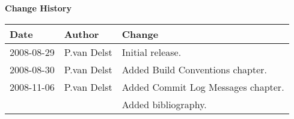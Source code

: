 \thispagestyle{empty}
\vspace*{10cm}
\begin{center}
  {\sffamily\Large\bfseries Change History}
  \begin{table}[htp]
    \centering
    \begin{tabular}{|p{2cm}|p{3cm}|p{8cm}|}
      \hline
      \sffamily\textbf{Date} & \sffamily\textbf{Author} & \sffamily\textbf{Change}\\
      \hline\hline
      2008-08-29 & P.van Delst & Initial release.\\
      \hline
      2008-08-30 & P.van Delst & Added Build Conventions chapter.\\
      \hline
      2008-11-06 & P.van Delst & Added Commit Log Messages chapter.\\
                 &             & Added bibliography.\\
      \hline
    \end{tabular}
  \end{table}
\end{center}
\clearpage

